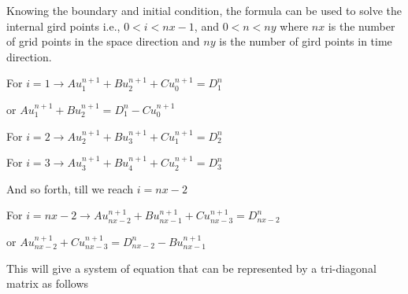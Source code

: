 Knowing the boundary and initial condition, the formula can be used to solve the internal gird points i.e., $0<i<nx-1$, and $0<n<ny$ where $nx$ is the number of grid points in the space direction and $ny$ is the number of gird points in time direction. 

\vspace{2mm}

For $i=1\longrightarrow Au_{1}^{n+1} +Bu_{2}^{n+1} +Cu_{0}^{n+1} = D_{1}^{n}$

\vspace{2mm}

or $Au_{1}^{n+1} +Bu_{2}^{n+1} = D_{1}^{n} -Cu_{0}^{n+1}$

\vspace{2mm}

For $i=2\longrightarrow Au_{2}^{n+1} +Bu_{3}^{n+1} +Cu_{1}^{n+1} = D_{2}^{n}$

\vspace{2mm}

For $i=3\longrightarrow Au_{3}^{n+1} +Bu_{4}^{n+1} +Cu_{2}^{n+1} = D_{3}^{n}$

And so forth, till we reach $i=nx-2$

\vspace{2mm}

For $i=nx-2\longrightarrow Au_{nx-2}^{n+1} +Bu_{nx-1}^{n+1} +Cu_{nx-3}^{n+1} = D_{nx-2}^{n}$

\vspace{2mm}

or $ Au_{nx-2}^{n+1} +Cu_{nx-3}^{n+1} = D_{nx-2}^{n} - Bu_{nx-1}^{n+1}$

\vspace{2mm}

This will give a system of equation that can be represented by a tri-diagonal matrix as follows 



